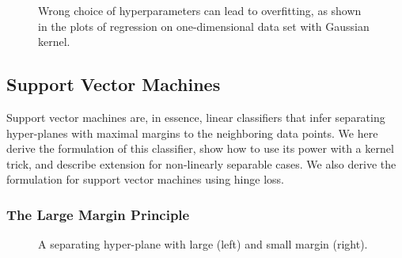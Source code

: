 \begin{refsection}
\begin{figure}
\caption{Wrong choice of hyperparameters can lead to overfitting, as shown in the plots of regression on one-dimensional data set with Gaussian kernel.}
\label{fig:kernels-poly}
\end{figure}

\subsection*{Support Vector Machines}

Support vector machines are, in essence, linear classifiers that infer separating hyper-planes with maximal margins to the neighboring data points. We here derive the formulation of this classifier, show how to use its power with a kernel trick, and describe extension for non-linearly separable cases. We also derive the formulation for support vector machines using hinge loss.

\subsubsection*{The Large Margin Principle}

\begin{figure}[htbp]
\caption{A separating hyper-plane with large (left) and small margin (right).}
\label{fig:svm-lin-sep}
\end{figure}


\end{refsection}
